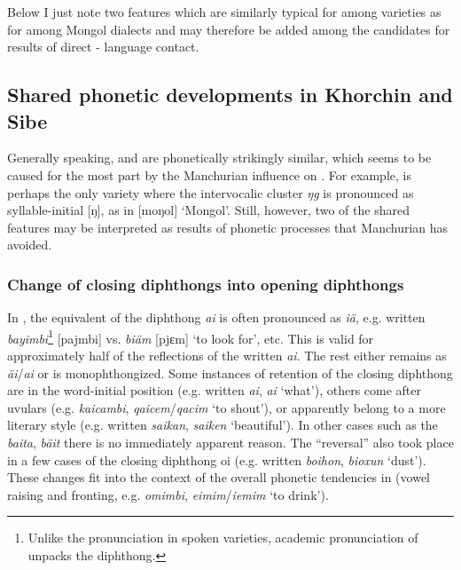 \documentclass[output=paper,colorlinks,citecolor=brown]{langscibook}
\begin{document}
Below I just note two features which are similarly typical for  among  varieties as for  among Mongol dialects and may therefore be added among the candidates for results of direct - language contact.

\subsection{Shared phonetic developments in Khorchin and Sibe}

Generally speaking,  and  are phonetically strikingly similar, which seems to be caused for the most part by the Manchurian influence on . For example,  is perhaps the only  variety where the intervocalic cluster \textit{ŋg} is pronounced as syllable-initial [ŋ], as in [moŋol] ‘Mongol’. Still, however, two of the shared features may be interpreted as results of phonetic processes that Manchurian  has avoided.

\subsubsection{Change of closing diphthongs into opening diphthongs}\label{section9.3.3}

In , the equivalent of the  diphthong \textit{ai} is often pronounced as \textit{iä}, e.g. written  \textit{bayimbi}\footnote{Unlike the pronunciation in spoken varieties, academic pronunciation of  unpacks the diphthong.} [pajmbi] vs.  \textit{biäm} [pjɛm] ‘to look for’, etc. This is valid for approximately half of the reflections of the written  \textit{ai}. The rest either remains as \textit{äi}/\textit{ai} or is monophthongized. Some instances of retention of the closing diphthong are in the word-initial position (e.g. written  \textit{ai},  \textit{ai} ‘what’), others come after uvulars (e.g.  \textit{kaicambi},  \textit{qaicem}/\textit{qacim} ‘to shout’), or apparently belong to a more literary style (e.g. written  \textit{saikan},  \textit{saiken} ‘beautiful’). In other cases such as the  \textit{baita},  \textit{bäit} there is no immediately apparent reason. The “reversal” also took place in a few cases of the closing diphthong oi (e.g. written  \textit{boihon},  \textit{bioxun} ‘dust’). These changes fit into the context of the overall phonetic tendencies in  (vowel raising and fronting, e.g.  \textit{omimbi},  \textit{eimim}/\textit{iemim} ‘to drink’).
\end{document}
